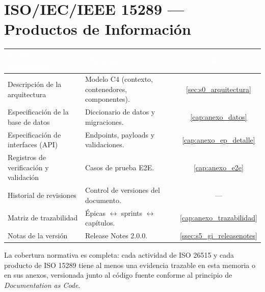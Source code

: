 \section{ISO/IEC/IEEE 15289 — Productos de Información}
\label{sec:anexo_iso_15289}
\renewcommand{\arraystretch}{1.3}
\fontsize{8.8}{10.5}\selectfont\sffamily
\noindent
\begin{tabularx}{\textwidth}{|X|X|c|}
\hline
\rowcolor{colorPrimario}
\textcolor{white}{\textbf{Producto de información}} & \textcolor{white}{\textbf{Ubicación}} & \textcolor{white}{\textbf{Ref.}} \\ \hline
Descripción de la arquitectura & Modelo C4 (contexto, contenedores, componentes). & \ref{sec:s0_arquitectura} \\ \hline
\rowcolor{grisTecnico}
Especificación de la base de datos & Diccionario de datos y migraciones. & \ref{cap:anexo_datos} \\ \hline
Especificación de interfaces (API) & Endpoints, payloads y validaciones. & \ref{cap:anexo_ep_detalle} \\ \hline
\rowcolor{grisTecnico}
Registros de verificación y validación & Casos de prueba E2E. & \ref{cap:anexo_e2e} \\ \hline
Historial de revisiones & Control de versiones del documento. & --- \\ \hline
\rowcolor{grisTecnico}
Matriz de trazabilidad & Épicas $\leftrightarrow$ sprints $\leftrightarrow$ capítulos. & \ref{cap:anexo_trazabilidad} \\ \hline
Notas de la versión & Release Notes 2.0.0. & \ref{ssec:s5_gi_releasenotes} \\ \hline
\end{tabularx}\normalfont\normalsize

\begin{NotaTecnica}
La cobertura normativa es completa: cada actividad de ISO 26515 y cada producto de ISO 15289
tiene al menos una evidencia trazable en esta memoria o en sus anexos, versionada junto al
código fuente conforme al principio de \textit{Documentation as Code}.
\end{NotaTecnica}

\clearpage
